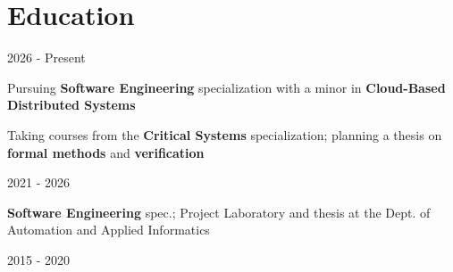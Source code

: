 \documentclass[]{deedy-resume-reversed}
\begin{document}

\section{Education}
\vspace{0.1 cm}
    \begin{twocolentry}{
       2026 - Present
    }
        \runsubsection{}\end{twocolentry}

    \vspace{0.10 cm}
    \begin{onecolentry}
        \begin{highlights}
            \item Pursuing \textbf{Software Engineering} specialization with a minor in \textbf{Cloud-Based Distributed Systems}
            \item Taking courses from the \textbf{Critical Systems} specialization; planning a thesis on \textbf{formal methods} and \textbf{verification}
        \end{highlights}
    \end{onecolentry}

    \vspace{0.3 cm}
    \begin{twocolentry}{
       2021 - 2026
    }
        \runsubsection{}\end{twocolentry}

    \vspace{0.10 cm}
    \begin{onecolentry}
        \begin{highlights}
            \item \textbf{Software Engineering} spec.; Project Laboratory and thesis at the Dept. of Automation and Applied Informatics
        \end{highlights}
    \end{onecolentry}

    \vspace{0.3 cm}

    \begin{twocolentry}{
        2015 - 2020
    }
        \end{twocolentry}
\end{document}
